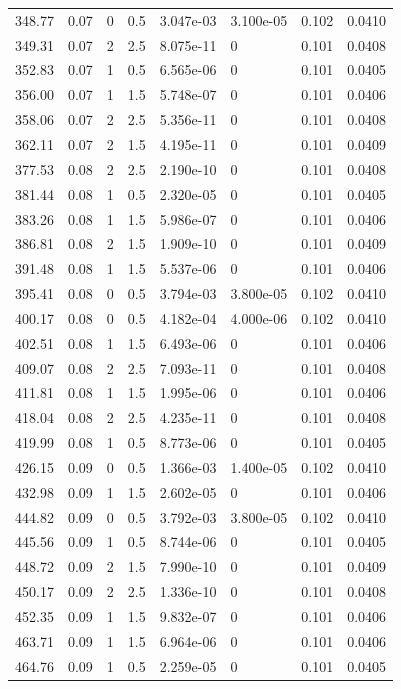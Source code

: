 \documentclass[preview]{standalone}
\begin{document}
{{{\begin{tabular}{L{1.2cm}C{1.2cm} C{0.3cm}C{0.5cm} C{1.4cm}C{1.4cm} C{1.4cm}C{1.4cm}}
  348.77  &  0.07  & 0     & 0.5 &  3.047e-03  & 3.100e-05  & 0.102 &  0.0410   \\ 
  349.31  &  0.07  & 2     & 2.5 &  8.075e-11  & 0  & 0.101 &  0.0408   \\ 
  352.83  &  0.07  & 1     & 0.5 &  6.565e-06  & 0  & 0.101 &  0.0405   \\ 
  356.00  &  0.07  & 1     & 1.5 &  5.748e-07  & 0  & 0.101 &  0.0406   \\ 
  358.06  &  0.07  & 2     & 2.5 &  5.356e-11  & 0  & 0.101 &  0.0408   \\ 
  362.11  &  0.07  & 2     & 1.5 &  4.195e-11  & 0  & 0.101 &  0.0409   \\ 
  377.53  &  0.08  & 2     & 2.5 &  2.190e-10  & 0  & 0.101 &  0.0408   \\ 
  381.44  &  0.08  & 1     & 0.5 &  2.320e-05  & 0  & 0.101 &  0.0405   \\ 
  383.26  &  0.08  & 1     & 1.5 &  5.986e-07  & 0  & 0.101 &  0.0406   \\ 
  386.81  &  0.08  & 2     & 1.5 &  1.909e-10  & 0  & 0.101 &  0.0409   \\ 
  391.48  &  0.08  & 1     & 1.5 &  5.537e-06  & 0  & 0.101 &  0.0406   \\ 
  395.41  &  0.08  & 0     & 0.5 &  3.794e-03  & 3.800e-05  & 0.102 &  0.0410   \\ 
  400.17  &  0.08  & 0     & 0.5 &  4.182e-04  & 4.000e-06  & 0.102 &  0.0410   \\ 
  402.51  &  0.08  & 1     & 1.5 &  6.493e-06  & 0  & 0.101 &  0.0406   \\ 
  409.07  &  0.08  & 2     & 2.5 &  7.093e-11  & 0  & 0.101 &  0.0408   \\ 
  411.81  &  0.08  & 1     & 1.5 &  1.995e-06  & 0  & 0.101 &  0.0406   \\ 
  418.04  &  0.08  & 2     & 2.5 &  4.235e-11  & 0  & 0.101 &  0.0408   \\ 
  419.99  &  0.08  & 1     & 0.5 &  8.773e-06  & 0  & 0.101 &  0.0405   \\ 
  426.15  &  0.09  & 0     & 0.5 &  1.366e-03  & 1.400e-05  & 0.102 &  0.0410   \\ 
  432.98  &  0.09  & 1     & 1.5 &  2.602e-05  & 0  & 0.101 &  0.0406   \\ 
  444.82  &  0.09  & 0     & 0.5 &  3.792e-03  & 3.800e-05  & 0.102 &  0.0410   \\ 
  445.56  &  0.09  & 1     & 0.5 &  8.744e-06  & 0  & 0.101 &  0.0405   \\ 
  448.72  &  0.09  & 2     & 1.5 &  7.990e-10  & 0  & 0.101 &  0.0409   \\ 
  450.17  &  0.09  & 2     & 2.5 &  1.336e-10  & 0  & 0.101 &  0.0408   \\ 
  452.35  &  0.09  & 1     & 1.5 &  9.832e-07  & 0  & 0.101 &  0.0406   \\ 
  463.71  &  0.09  & 1     & 1.5 &  6.964e-06  & 0  & 0.101 &  0.0406   \\ 
  464.76  &  0.09  & 1     & 0.5 &  2.259e-05  & 0  & 0.101 &  0.0405   \\ 
\hline 
\end{tabular} 

}}}
\end{document}

